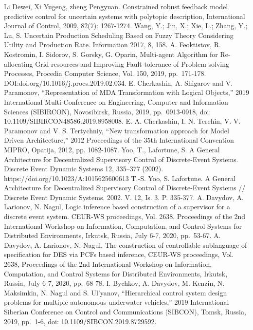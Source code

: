 \documentclass[conference]{IEEEtran}
\begin{document}
\begin{thebibliography}{999}
     Li Dewei, Xi Yugeng, zheng Pengyuan. Constrained robust feedback model predictive control for uncertain systems with polytopic description, International Journal of Control, 2009, 82(7): 1267-1274.
     Wang, Y.; Jin, X.; Xie, L.; Zhang, Y.; Lu, S. Uncertain Production Scheduling Based on Fuzzy Theory Considering Utility and Production Rate. Information 2017, 8, 158.
     A. Feoktistov, R. Kostromin, I. Sidorov, S. Gorsky, G. Oparin, Multi-agent Algorithm for Re-allocating Grid-resources and Improving Fault-tolerance of Problem-solving Processes, Procedia Computer Science, Vol. 150, 2019, pp. 171-178. DOI:doi.org/10.1016/j.procs.2019.02.034.
     E. Cherkashin, A. Shigarov and V. Paramonov, “Representation of MDA Transformation with Logical Objects,” 2019 International Multi-Conference on Engineering, Computer and Information Sciences (SIBIRCON), Novosibirsk, Russia, 2019, pp. 0913-0918, doi: 10.1109/SIBIRCON48586.2019.8958008.
     E. A. Cherkashin, I. N. Terehin, V. V. Paramonov and V. S. Tertychniy, ``New transformation approach for Model Driven Architecture,'' 2012 Proceedings of the 35th International Convention MIPRO, Opatija, 2012, pp. 1082-1087.
     Yoo, T., Lafortune, S. A General Architecture for Decentralized Supervisory Control of Discrete-Event Systems. Discrete Event Dynamic Systems 12, 335–377 (2002). https://doi.org/10.1023/A:1015625600613
     T.-S. Yoo, S. Lafortune. A General Architecture for Decentralized Supervisory Control of Discrete-Event Systems // Discrete Event Dynamic Systems. 2002. V. 12, Is. 3. P. 335-377.
     A. Davydov, A. Larionov, N. Nagul, Logic inference based construction of a supervisor for a discrete event system. CEUR-WS proceedings, Vol. 2638, Proceedings of the 2nd International Workshop on Information, Computation, and Control Systems for Distributed Environments, Irkutsk, Russia, July 6-7, 2020,  pp.~53-67.
     A. Davydov, A. Larionov, N. Nagul, The construction of controllable sublanguage of specification for DES via PCFs based inference, CEUR-WS proceedings, Vol. 2638, Proceedings of the 2nd International Workshop on Information, Computation, and Control Systems for Distributed Environments, Irkutsk, Russia, July 6-7, 2020, pp.~68-78.
     I. Bychkov, A. Davydov, M. Kenzin, N. Maksimkin, N. Nagul and S. Ul’yanov, “Hierarchical control system design problems for multiple autonomous underwater vehicles,” 2019 International Siberian Conference on Control and Communications (SIBCON), Tomsk, Russia, 2019, pp. 1-6, doi: 10.1109/SIBCON.2019.8729592.

\end{thebibliography}
\end{document}
